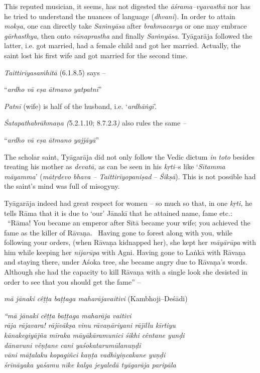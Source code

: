 This reputed musician, it seems, has not digested the \textit{āśrama–vyavasthā} nor has he tried to understand the nuances of language (\textit{dhvani}). In order to attain \textit{mokṣa}, one can directly take \textit{Saṁnyāsa} after \textit{brahmacarya} or one may embrace \textit{gārhasthya}, then onto \textit{vānaprastha} and finally \textit{Saṁnyāsa}. Tyāgarāja followed the latter, i.e. got married, had a female child and got her married. Actually, the saint lost his first wife and got married for the second time.

\textit{Taittirīyasaṁhitā} (6.1.8.5) says –

\begin{myquote}
“\textit{ardho vā eṣa ātmano yatpatnī}”
\end{myquote}

\textit{Patnī} (wife) is half of the husband, i.e. ‘\textit{ardhāṅgī}’.

\newpage

\textit{Śatapathabrāhmaṇa (}5.2.1.10; 8.7.2.3\textit{)} also rules the same \textit{–}

\begin{myquote}
\textit{}“\textit{ardho vā eṣa ātmano yajjāyā}”
\end{myquote}

The scholar saint, Tyāgarāja did not only follow the Vedic dictum \textit{in toto} besides treating his mother as \textit{devatā,} as can be seen in his \textit{kṛti}–s like ‘\textit{Sītamma māyamma}’ (\textit{mātṛdevo bhava – Taittirīyopaniṣad} – \textit{Śikṣā}). This is not possible had the saint’s mind was full of misogyny.

Tyāgarāja indeed had great respect for women – so much so that, in one \textit{kṛti,} he tells Rāma that it is due to ‘our’ Jānakī that he attained name, fame etc.:  “Rāma! You became an emperor after Sītā became your wife; you achieved the fame as the killer of Rāvaṇa.  Having gone to forest along with you, while following your orders, (when Rāvaṇa kidnapped her), she kept her \textit{māyārūpa} with him while keeping her \textit{nijarūpa} with Agni. Having gone to Laṅkā with Rāvaṇa and staying there, under Aśoka tree, she became angry due to Rāvaṇa’s words. Although she had the capacity to kill Rāvaṇa with a single look she desisted in order to see that you should get the fame” –  

\textit{mā jānaki cêṭṭa baṭṭaga maharājavaitivi} (Kambhoji–Deśādi)

\begin{myquote}
\textit{“mā jānaki cêṭṭa baṭṭaga maharāja vaitivi}\\\textit{rāja rājavara! rājīvākṣa vinu rāvaṇāriyani rājillu kīrtiyu}\\\textit{kānakegiyājña mīraka māyākāramunici śikhi cêntane yunḍi}\\\textit{dānavuni vêṇṭane cani yaśokatarumūlanuṇḍi}\\\textit{vāni māṭalaku kopagiñci kaṇṭa vadhiyiṇcakane yuṇḍi} \\\textit{śrīnāyaka yaśamu nīke kalga jeyaledā tyāgarāja paripāla}
\end{myquote}

